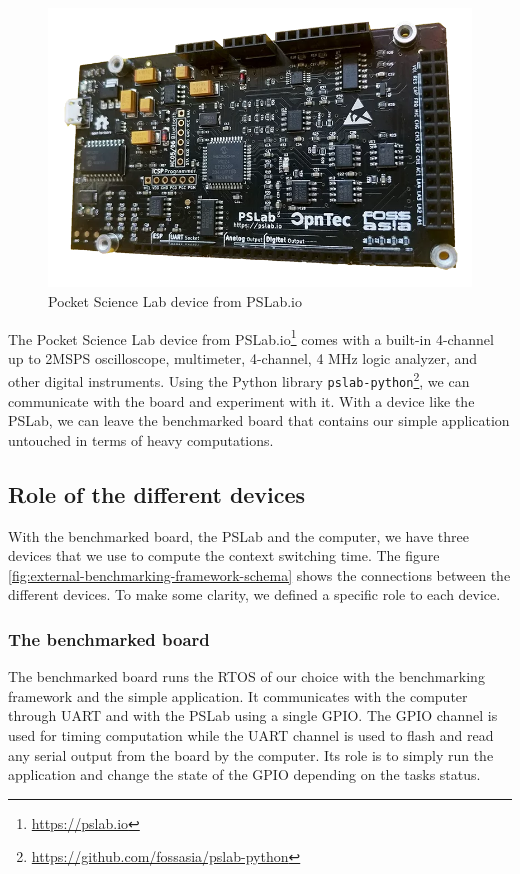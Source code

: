 \begin{figure}[!ht]
  \centering
  \includegraphics[scale=0.25]{assets/pslab.png}
  \caption{\label{fig:pslab}Pocket Science Lab device from PSLab.io}
\end{figure}

The Pocket Science Lab device from PSLab.io\footnote{\url{https://pslab.io}} comes 
  with a built-in 4-channel up to 2MSPS oscilloscope, multimeter, 4-channel, 4 MHz logic analyzer, and other digital instruments.
Using the Python library \texttt{pslab-python}\footnote{\url{https://github.com/fossasia/pslab-python}}, we can communicate with the board and experiment with it.
With a device like the PSLab, we can leave the benchmarked board that contains our simple application untouched in terms of heavy computations.

\subsection{Role of the different devices}

With the benchmarked board, the PSLab and the computer, we have three devices that we use to compute the context switching time.
The figure \ref{fig:external-benchmarking-framework-schema} shows the connections between the different devices.
To make some clarity, we defined a specific role to each device.

\subsubsection{The benchmarked board}
The benchmarked board runs the RTOS of our choice with the benchmarking framework and the simple application.
It communicates with the computer through UART and with the PSLab using a single GPIO.
The GPIO channel is used for timing computation while the UART channel is used to flash and read any serial output from the board by the computer.
Its role is to simply run the application and change the state of the GPIO depending on the tasks status.


